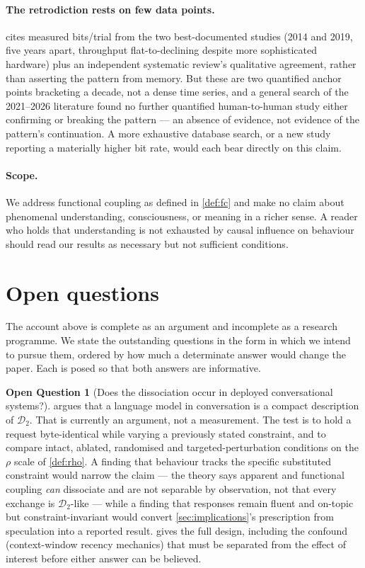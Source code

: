 \documentclass[11pt,a4paper]{article}
\theoremstyle{plain}
\theoremstyle{definition}
\newtheorem{question}{Open Question}
\theoremstyle{remark}
\newcommand{\Dy}{\mathcal{D}}
\begin{document}
\paragraph{The retrodiction rests on few data points.}
 cites measured bits/trial from the two best-documented studies (2014 and 2019, five years apart,
throughput flat-to-declining despite more sophisticated hardware) plus an independent systematic review's
qualitative agreement, rather than asserting the pattern from memory. But these are two quantified anchor points
bracketing a decade, not a dense time series, and a general search of the 2021--2026 literature found no further
quantified human-to-human study either confirming or breaking the pattern --- an absence of evidence, not
evidence of the pattern's continuation. A more exhaustive database search, or a new study reporting a materially
higher bit rate, would each bear directly on this claim.

\paragraph{Scope.}
We address functional coupling as defined in \cref{def:fc} and make no claim about phenomenal understanding,
consciousness, or meaning in a richer sense. A reader who holds that understanding is not exhausted by causal
influence on behaviour should read our results as necessary but not sufficient conditions.

\section{Open questions}\label{sec:open}

The account above is complete as an argument and incomplete as a research programme. We state the outstanding
questions in the form in which we intend to pursue them, ordered by how much a determinate answer would change
the paper. Each is posed so that both answers are informative.

\begin{question}[Does the dissociation occur in deployed conversational systems?]\label{q:humanai}
 argues that a language model in conversation is a compact description of $\Dy_2$. That is
currently an argument, not a measurement. The test is to hold a request byte-identical while varying a
previously stated constraint, and to compare intact, ablated, randomised and targeted-perturbation conditions on
the $\rho$ scale of \cref{def:rho}. A finding that behaviour tracks the specific substituted constraint would
narrow the claim --- the theory says apparent and functional coupling \emph{can} dissociate and are not
separable by observation, not that every exchange is $\Dy_2$-like --- while a finding that responses remain
fluent and on-topic but constraint-invariant would convert \cref{sec:implications}'s prescription from
speculation into a reported result.  gives the full design, including the confound
(context-window recency mechanics) that must be separated from the effect of interest before either answer can
be believed.
\end{question}
\end{document}
